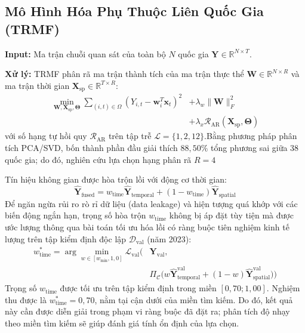 \documentclass[10pt,journal,compsoc]{IEEEtran}
\begin{document}
\subsection{Mô Hình Hóa Phụ Thuộc Liên Quốc Gia (TRMF)}
\noindent \textbf{Input:} Ma trận chuỗi quan sát của toàn bộ $N$ quốc gia $\mathbf{Y} \in \mathbb{R}^{N \times T}$.

\noindent \textbf{Xử lý:} TRMF \cite{yu2016trmf} phân rã ma trận thành tích của ma trận thực thể $\mathbf{W} \in \mathbb{R}^{N \times R}$ và ma trận thời gian $\mathbf{X}_{\text{sp}} \in \mathbb{R}^{T \times R}$:
\begin{equation}
\begin{aligned}
\min_{\mathbf{W}, \mathbf{X}_{\text{sp}}, \boldsymbol{\Theta}} \sum_{(i, t) \in \Omega} (Y_{i, t} - \mathbf{w}_i^T \mathbf{x}_t)^2 &+ \lambda_w \|\mathbf{W}\|_F^2 \\
&+ \lambda_x \mathcal{R}_{\text{AR}}(\mathbf{X}_{\text{sp}}, \boldsymbol{\Theta})
\end{aligned}
\end{equation}
với số hạng tự hồi quy $\mathcal{R}_{\text{AR}}$ trên tập trễ $\mathcal{L} = \{1, 2, 12\}$.Bằng phương pháp phân tích PCA/SVD, bốn thành phần đầu giải thích $88{,}50\%$ tổng phương sai giữa 38 quốc gia; do đó, nghiên cứu lựa chọn hạng phân rã $R=4$

Tín hiệu không gian được hòa trộn lồi với động cơ thời gian:
\begin{equation}
\hat{\mathbf{Y}}_{\text{fused}} = w_{\text{time}} \hat{\mathbf{Y}}_{\text{temporal}} + (1 - w_{\text{time}}) \hat{\mathbf{Y}}_{\text{spatial}}
\end{equation}
Để ngăn ngừa rủi ro rò rỉ dữ liệu (data leakage) và hiện tượng quá khớp với các biến động ngắn hạn, trọng số hòa trộn $w_{\text{time}}$ không bị áp đặt tùy tiện mà được ước lượng thông qua bài toán tối ưu hóa lồi có ràng buộc tiên nghiệm kinh tế lượng trên tập kiểm định độc lập $\mathcal{D}_{\text{val}}$ (năm 2023):
\begin{equation}
\begin{aligned}
w_{\text{time}}^* = \arg\min_{w \in [w_{\min}, 1,0]} \mathcal{L}_{\text{val}}\Big( & \mathbf{Y}_{\text{val}}, \\
& \Pi_{\mathcal{C}}\big(w \hat{\mathbf{Y}}_{\text{temporal}}^{\text{val}} + (1 - w) \hat{\mathbf{Y}}_{\text{spatial}}^{\text{val}}\big)\Big)
\end{aligned}
\end{equation}
Trọng số \(w_{\text{time}}\) được tối ưu trên tập kiểm định trong miền \([0{,}70;1{,}00]\). Nghiệm thu được là \(w_{\text{time}}^*=0{,}70\), nằm tại cận dưới của miền tìm kiếm. Do đó, kết quả này cần được diễn giải trong phạm vi ràng buộc đã đặt ra; phân tích độ nhạy theo miền tìm kiếm sẽ giúp đánh giá tính ổn định của lựa chọn.
\end{document}
